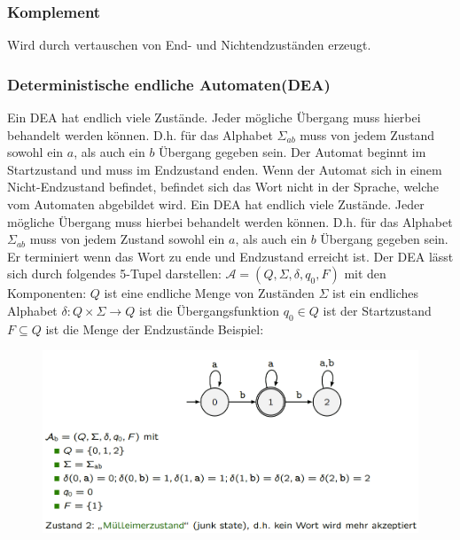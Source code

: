 \documentclass[12pt,a4paper]{article}
\begin{document}
\subsubsection{Komplement}
Wird durch vertauschen von End- und Nichtendzuständen erzeugt.

\subsubsection{Deterministische endliche Automaten(DEA)}
Ein DEA hat endlich viele Zustände. Jeder mögliche Übergang muss hierbei behandelt werden können. D.h. für das Alphabet $\varSigma_{ab}$ muss von jedem Zustand sowohl ein $a$, als auch ein $b$ Übergang gegeben sein. Der Automat beginnt im Startzustand und muss im Endzustand enden. Wenn der Automat sich in einem Nicht-Endzustand befindet, befindet sich das Wort nicht in der Sprache, welche vom Automaten abgebildet wird.\newline
Ein DEA hat endlich viele Zustände. Jeder mögliche Übergang muss hierbei behandelt werden können. D.h. für das Alphabet $\varSigma_{ab}$ muss von jedem Zustand sowohl ein $a$, als auch ein $b$ Übergang gegeben sein. Er terminiert wenn das Wort zu ende und Endzustand erreicht ist.
\noindent Der DEA lässt sich durch folgendes 5-Tupel darstellen:\newline
$\mathcal{A} = (Q, \varSigma, \delta, q_0, F)$ mit den Komponenten:\newline
$Q$ ist eine endliche Menge von Zuständen\newline
$\varSigma$ ist ein endliches Alphabet\newline
$\delta: Q \times \varSigma \rightarrow Q$ ist die Übergangsfunktion\newline
$q_0 \in Q$ ist der Startzustand\newline
$F \subseteq Q$ ist die Menge der Endzustände\newline
\newline
Beispiel:\newline
\begin{center}
	\begin{figure}[!h]
		\includegraphics[width=\textwidth]{Bilder/DEA_Beispiel.PNG}
	\end{figure}
\end{center}
\end{document}
